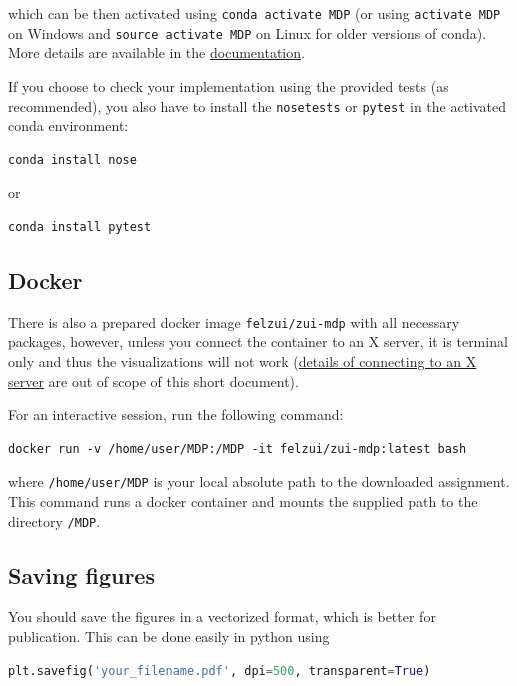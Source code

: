 \documentclass[10pt,journal,compsoc,twoside]{IEEEtran}
\begin{document}
which can be then activated using \lstinline[language=none]{conda activate MDP} (or using \lstinline[language=none]{activate MDP} on Windows and \lstinline[language=none]{source activate MDP} on Linux for older versions of conda). More details are available in the \href{https://conda.io/docs/user-guide/tasks/manage-environments.html}{documentation}.

If you choose to check your implementation using the provided tests (as recommended), you also have to install the \texttt{nosetests} or \texttt{pytest} in the activated conda environment:
\begin{lstlisting}[language=none]
conda install nose
\end{lstlisting}
or
\begin{lstlisting}[language=none]
conda install pytest
\end{lstlisting}

\subsection{Docker}
There is also a prepared docker image \texttt{felzui/zui-mdp} with all necessary packages, however, unless you connect the container to an X server, it is terminal only and thus the visualizations will not work (\href{https://dev.to/darksmile92/run-gui-app-in-linux-docker-container-on-windows-host-4kde}{details of connecting to an X server} are out of scope of this short document).

For an interactive session, run the following command:
\begin{lstlisting}[language=none]
docker run -v /home/user/MDP:/MDP -it felzui/zui-mdp:latest bash
\end{lstlisting}
where \lstinline[language=none]{/home/user/MDP} is your local absolute path to the downloaded assignment. This command runs a docker container and mounts the supplied path to the directory \lstinline[language=none]{/MDP}.

\subsection{Saving figures}
You should save the figures in a vectorized format, which is better for publication. This can be done easily in python using 

\begin{lstlisting}[language=python]
plt.savefig('your_filename.pdf', dpi=500, transparent=True)
\end{lstlisting}

\end{document}
